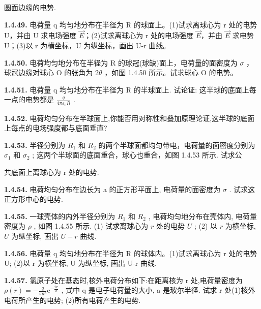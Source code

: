 圆面边缘的电势.

\vfill

\newpage
\textbf{1.4.49.} 电荷量 q 均匀地分布在半径为 R 的球面上。(1)试求离球心为 r 处的电势 U，并由 U 求电场强度 $\vec{E}$；(2)试求离球心为 r 处的电场强度 $\vec{E}$，并由 $\vec{E}$ 求电势 U；(3)以 r 为横坐标，U 为纵坐标，画出 U-r 曲线。

\vfill

\textbf{1.4.50.} 电荷均匀地分布在半径为 R 的球冠(球缺)面上，电荷量的面密度为 $\sigma$ ，球冠边缘对球心 O 的张角为 $2\theta$ ，如图 1.4.50 所示。试求球心 O 的电势。

\vfill

\newpage
\textbf{1.4.51.} 电荷量 q 均匀地分布在半径为 R 的半球面上. 试论证: 这半球的底面上每一点的电势都是 $\displaystyle \frac{q}{4\pi\varepsilon_{0}R}$ .

\vfill

\textbf{1.4.52.} 电荷均匀分布在半球面上,你能否用对称性和叠加原理论证,这半球的底面上每点的电场强度都与底面垂直?

\vfill

\newpage
\textbf{1.4.53.} 半径分别为 $R_{1}$ 和 $R_{2}$ 的两个半球面都均匀带电，电荷量的面密度分别为 $\sigma_{1}$ 和 $\sigma_{2}$ ; 这两个半球面的底面重合，球心也重合，如图 1.4.53 所示. 试求公


共底面上离球心为 r 处的电势.

\begin{center}
\end{center}

\vfill

\textbf{1.4.54.} 电荷均匀分布在边长为 a 的正方形平面上, 电荷量的面密度为 $\sigma$ . 试求这正方形中心的电势.

\vfill

\newpage
\textbf{1.4.55.} 一球壳体的内外半径分别为 $R_{1}$ 和 $R_{2}$ , 电荷均匀地分布在壳体内, 电荷量密度为 $\rho$ , 如图 1.4.55 所示. (1) 试求离球心为 $r$ 处的电势 $U$ ; (2) 以 $r$ 为横坐标, $U$ 为纵坐标, 画出 $U - r$ 曲线.

\vfill

\textbf{1.4.56.} 电荷量 q 均匀地分布在半径为 R 的球体内。(1)试求离球心为 r 处的电势 U; (2)以 r 为横坐标, U 为纵坐标, 画出 U-r 曲线.

\vfill

\newpage
\textbf{1.4.57.} 氢原子处在基态时,核外电荷分布如下:在距离核为 r 处,电荷量密度为 $\displaystyle \rho(r)=-\frac{q}{\pi a^{3}}\mathrm{e}^{-\frac{2r}{a}}$ , 式中 q 是电子电荷量的大小, a 是玻尔半径. 试求 r 处(1)核外电荷所产生的电势; (2)所有电荷产生的电势.

